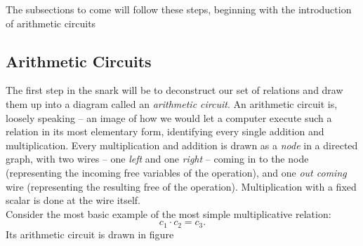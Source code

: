 \documentclass[11pt,oneside]{article}
\theoremstyle{definition}
\theoremstyle{remark}
\numberwithin{equation}{section}
\begin{document}
The subsections to come will follow these steps, beginning with the introduction of arithmetic circuits

\subsection{Arithmetic Circuits}\label{sec:circuits:arith}

The first step in the snark  will be to deconstruct our set of relations and
draw them up into a diagram called an \emph{arithmetic circuit}. An arithmetic
circuit is, loosely speaking -- an image of how we would let a computer execute
such a relation in its most elementary form, identifying every single addition
and multiplication. Every multiplication and addition is drawn as a \emph{node}
in a directed graph, with two wires -- one \emph{left} and one \emph{right} --
coming in to the node (representing the incoming free variables of the
operation), and one \emph{out coming} wire (representing the resulting free of
the operation). Multiplication with a fixed scalar is done at the wire itself.\\
Consider the most basic example of the most simple multiplicative relation:
$$c_1\cdot c_2=c_3.$$ Its arithmetic circuit is drawn in figure
\end{document}
